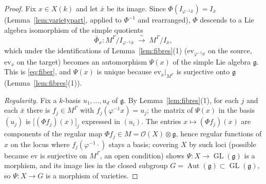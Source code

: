 \documentclass{amsart}
\theoremstyle{definition}
\DeclareMathOperator{\Aut}{Aut}
\DeclareMathOperator{\GL}{GL}
\newcommand{\g}{\mathfrak{g}}
\newcommand{\OO}{\mathcal{O}}
\newcommand{\M}{M}
\begin{document}
\begin{proof}
Fix $x\in X(k)$ and let $\bar x$ be its image.  Since
$\Phi(I_{\varphi^{-1}\bar x})=I_{\bar x}$ (Lemma~\ref{lem:varietypart},
applied to $\Phi^{-1}$ and rearranged), $\Phi$ descends to a Lie algebra
isomorphism of the simple quotients
\[
\bar\Phi_x\colon \M^\Gamma/I_{\varphi^{-1}\bar x}\;\xrightarrow{\ \sim\ }\;
\M^\Gamma/I_{\bar x},
\]
which under the identifications of Lemma~\ref{lem:fibres}(1)
($\mathrm{ev}_{\varphi^{-1}x}$ on the source, $\mathrm{ev}_x$ on the
target) becomes an automorphism $\Psi(x)$ of the simple Lie algebra $\g$.
This is \eqref{eq:fiber}, and $\Psi(x)$ is unique because
$\mathrm{ev}_x|_{\M^\Gamma}$ is surjective onto $\g$
(Lemma~\ref{lem:fibres}(1)).

\emph{Regularity.}  Fix a $k$-basis $u_1,\dots,u_d$ of $\g$.  By
Lemma~\ref{lem:fibres}(1), for each $j$ and each $\bar x$ there is
$f_j\in\M^\Gamma$ with $f_j(\varphi^{-1}x)=u_j$; the matrix of $\Psi(x)$ in
the basis $(u_j)$ is $\bigl[(\Phi f_j)(x)\bigr]_j$ expressed in $(u_i)$.
The entries $x\mapsto(\Phi f_j)(x)$ are components of the regular map
$\Phi f_j\in\M=\OO(X)\otimes\g$, hence regular functions of $x$ on the
locus where $f_j(\varphi^{-1}\cdot)$ stays a basis; covering $X$ by such
loci (possible because $\mathrm{ev}$ is surjective on $\M^\Gamma$, an open
condition) shows $\Psi\colon X\to\GL(\g)$ is a morphism, and its image lies
in the closed subgroup $G=\Aut(\g)\subset\GL(\g)$, so $\Psi\colon X\to G$
is a morphism of varieties.


\end{proof}
\end{document}
